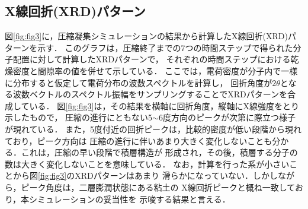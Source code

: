 ﻿\documentclass[11pt,a4j]{jarticle}
\begin{document}
\subsection{X線回折(XRD)パターン}
図\ref{fig:fig3}に，圧縮凝集シミュレーションの結果から計算したX線回折(XRD)パターンを示す．
このグラフは，圧縮終了までの7つの時間ステップで得られた分子配置に対して計算したXRDパターンで，
それぞれの時間ステップにおける乾燥密度と間隙率の値を併せて示している．
ここでは，電荷密度が分子内で一様に分布すると仮定して電荷分布の波数スペクトルを計算し，
回折角度が$2\theta$となる波数ベクトルのスペクトル振幅をサンプリングすることでXRDパターンを合成している．
図\ref{fig:fig3}は，その結果を横軸に回折角度，縦軸にX線強度をとり示したもので，
圧縮の進行にともない5$\sim$6度方向のピークが次第に際立つ様子が現れている．
また，5度付近の回折ピークは，比較的密度が低い段階から現れており，ピーク方向は
圧縮の進行に伴いあまり大きく変化しないことも分かる．これは，圧縮の早い段階で積層構造が
形成され，その後，積層する分子の数は大きく変化しないことを意味している．
なお，計算を行った系が小さいことから図\ref{fig:fig3}のXRDパターンはあまり
滑らかになっていない．しかしながら，ピーク角度は，二層膨潤状態にある粘土の
X線回折ピークと概ね一致しており\cite{Morodome}，本シミュレーションの妥当性を
示唆する結果と言える．
\end{document}
